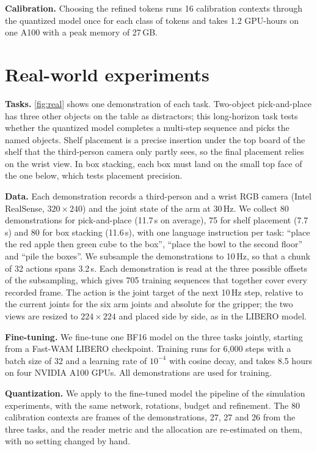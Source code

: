 \noindent\textbf{Calibration.}
Choosing the refined tokens runs 16 calibration contexts through the quantized model once for each class of tokens and takes 1.2 GPU-hours on one A100 with a peak memory of 27\,GB.

\section{Real-world experiments}
\label{sec:supp:real}

\noindent\textbf{Tasks.}
\cref{fig:real} shows one demonstration of each task.
Two-object pick-and-place has three other objects on the table as distractors; this long-horizon task tests whether the quantized model completes a multi-step sequence and picks the named objects.
Shelf placement is a precise insertion under the top board of the shelf that the third-person camera only partly sees, so the final placement relies on the wrist view.
In box stacking, each box must land on the small top face of the one below, which tests placement precision.

\noindent\textbf{Data.}
Each demonstration records a third-person and a wrist RGB camera (Intel RealSense, $320\times240$) and the joint state of the arm at 30\,Hz.
We collect 80 demonstrations for pick-and-place (11.7\,s on average), 75 for shelf placement (7.7\,s) and 80 for box stacking (11.6\,s), with one language instruction per task: ``place the red apple then green cube to the box'', ``place the bowl to the second floor'' and ``pile the boxes''.
We subsample the demonstrations to 10\,Hz, so that a chunk of 32 actions spans 3.2\,s.
Each demonstration is read at the three possible offsets of the subsampling, which gives 705 training sequences that together cover every recorded frame.
The action is the joint target of the next 10\,Hz step, relative to the current joints for the six arm joints and absolute for the gripper; the two views are resized to $224 \times 224$ and placed side by side, as in the LIBERO model.

\noindent\textbf{Fine-tuning.}
We fine-tune one BF16 model on the three tasks jointly, starting from a Fast-WAM LIBERO checkpoint.
Training runs for 6{,}000 steps with a batch size of 32 and a learning rate of $10^{-4}$ with cosine decay, and takes 8.5 hours on four NVIDIA A100 GPUs.
All demonstrations are used for training.

\noindent\textbf{Quantization.}
We apply to the fine-tuned model the pipeline of the simulation experiments, with the same network, rotations, budget and refinement.
The 80 calibration contexts are frames of the demonstrations, 27, 27 and 26 from the three tasks, and the reader metric and the allocation are re-estimated on them, with no setting changed by hand.

